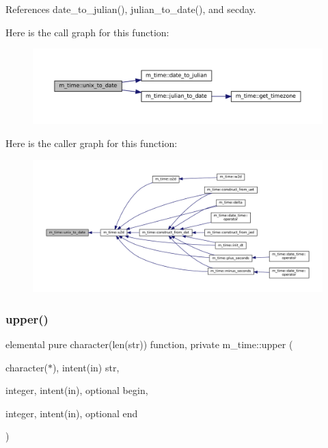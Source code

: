 References date\+\_\+to\+\_\+julian(), julian\+\_\+to\+\_\+date(), and secday.

Here is the call graph for this function\+:\nopagebreak
\begin{figure}[H]
\begin{center}
\leavevmode
\includegraphics[width=350pt]{namespacem__time_acc62ada23f8fa2fe67b428702fbcbf1c_cgraph}
\end{center}
\end{figure}
Here is the caller graph for this function\+:\nopagebreak
\begin{figure}[H]
\begin{center}
\leavevmode
\includegraphics[width=350pt]{namespacem__time_acc62ada23f8fa2fe67b428702fbcbf1c_icgraph}
\end{center}
\end{figure}
\mbox{\label{namespacem__time_af7c0157f921a2716ede225374095c6f2}} 
\subsubsection{\texorpdfstring{upper()}{upper()}}
{\footnotesize\ttfamily elemental pure character(len(str)) function, private m\+\_\+time\+::upper (\begin{DoxyParamCaption}\item[{character($\ast$), intent(in)}]{str,  }\item[{integer, intent(in), optional}]{begin,  }\item[{integer, intent(in), optional}]{end }\end{DoxyParamCaption})\hspace{0.3cm}{\ttfamily [private]}}




